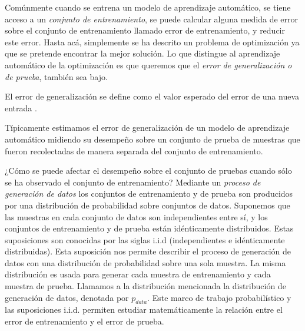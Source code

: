 Comúnmente cuando se entrena un modelo de aprendizaje automático, se
tiene acceso a un \textit{conjunto de entrenamiento}, se puede calcular alguna
medida de error sobre el conjunto de entrenamiento llamado error de
entrenamiento, y reducir este error. Hasta acá, simplemente se ha descrito
un problema de optimización ya que se pretende encontrar la mejor solución.
Lo que distingue al aprendizaje automático de la optimización es que
queremos que el \textit{error de generalización o de prueba}, también sea bajo.\\

\begin{remark}
El error de generalización se define como el valor esperado del error de
una nueva entrada \cite{iangoodfellowyoshuabengioaaroncourville2017}. 
\end{remark}


Típicamente estimamos el error de generalización de un modelo de
aprendizaje automático midiendo su desempeño sobre un conjunto de prueba de
muestras que fueron recolectadas de manera separada del conjunto de
entrenamiento.

¿Cómo se puede afectar el desempeño sobre el conjunto de pruebas cuando
sólo se ha observado el conjunto de entrenamiento? 
Mediante un \textit{proceso de generación de datos} los conjuntos de 
entrenamiento y de prueba son producidos por una 
distribución de probabilidad sobre conjuntos de datos. 
Suponemos que
las muestras en cada conjunto de datos son independientes entre sí, y
los conjuntos de entrenamiento y de prueba están idénticamente
distribuidos. Estas suposiciones
son conocidas por las siglas i.i.d (independientes e idénticamente distribuidas). Esta suposición nos permite describir el proceso de
generación de datos con una distribución de probabilidad sobre una sola
muestra. La misma distribución es usada para generar cada muestra de
entrenamiento y cada muestra de prueba. Llamamos a la distribución
mencionada la distribución de generación de datos, denotada por $p_{data}$.
Este marco de trabajo probabilístico y las suposiciones i.i.d. permiten
estudiar matemáticamente la relación entre el error de entrenamiento y
el error de prueba.

